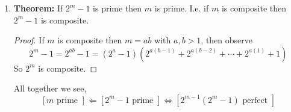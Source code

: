 \documentclass[class=article, crop=false]{standalone}
\begin{document}
\begin{enumerate}
\begin{proof}
	$ $\\
	$\Leftarrow$: Suppose $2^m -1$ is prime with $m\geq 2$. Define $n=2^{m-1}(2^m -1)$ and
	claim that $n$ is perfect. Claim $\sigma(n) =2n$, look at $\sigma(n) = \sigma(2^{m-1} (2^m -1))$
	well, $2^m -1\geq 3$ and is odd, $2^{m-1}$ is a power of 2, so $\gcd(2^{m-1}, 2^m-1)=1$. So,
	$\sigma(2^{m-1} (2^m -1)) = \sigma(2^{m-1}) \sigma(2^m -1)$. Then observe from $5.2.2a$,
	$$\sigma(2^{m-1}) = \frac{2^m -1}{2-1} = 2^m-1$$
	and $$\sigma(2^m -1) = 1+(2^m -1)$$
	because $2^m -1$ is prime.
	So $\sigma(2^{m-1}) \sigma(2^m -1) = (2^m -1)(2^m) = 2\cdot 2^{m-1}(2^m -1)=2n$.
	Thus, $\sigma(n) = 2n$. \\

	$\Rightarrow$: This direction is fairly lengthy and will be omitted. It is
	in the text if you're interested.
\end{proof}

\item \textbf{Theorem:} If $2^m -1$ is prime then $m$ is prime. I.e. if $m$ is composite 
then $2^m - 1$ is composite.
\begin{proof}
	If $m$ is composite then $m=ab$ with $a,b>1$, then observe
	$$2^m -1 = 2^{ab}-1 = (2^{a} -1)(2^{a(b-1)} + 2^{a(b-2)}+ \cdots + 2^{a(1)} + 1)$$
	So $2^m$ is composite.
\end{proof}

\noindent All together we see,
$$\left[m\mbox{ prime } \right] \Leftarrow \left[2^{m}-1 \mbox{ prime }\right] \iff \left[2^{m-1}(2^m -1) \mbox{ perfect }\right]$$

\end{enumerate}

\end{document}
